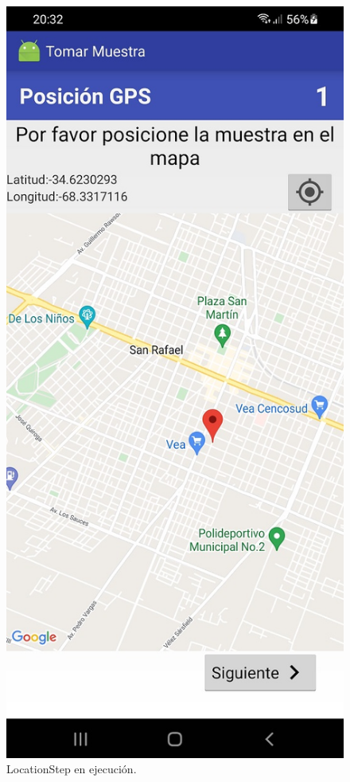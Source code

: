 \begin{figure}[H]
  \centering
    \includegraphics[scale=0.3]{50-anexos/C-steps/location_screen.jpg} 
    \caption{LocationStep en ejecución.}
\end{figure}

